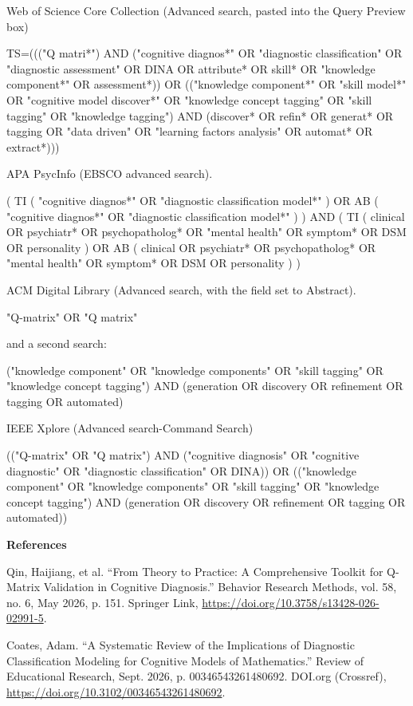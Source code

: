 \documentclass[sigconf]{acmart}
\begin{document}
Web of Science Core Collection (Advanced search, pasted into the Query Preview box)

TS=((("Q matri*") AND ("cognitive diagnos*" OR "diagnostic classification" OR "diagnostic assessment" OR DINA OR attribute* OR skill* OR "knowledge component*" OR assessment*)) OR (("knowledge component*" OR "skill model*" OR "cognitive model discover*" OR "knowledge concept tagging" OR "skill tagging" OR "knowledge tagging") AND (discover* OR refin* OR generat* OR tagging OR "data driven" OR "learning factors analysis" OR automat* OR extract*)))

APA PsycInfo (EBSCO advanced search). 

( TI ( "cognitive diagnos*" OR "diagnostic classification model*" ) OR AB ( "cognitive diagnos*" OR "diagnostic classification model*" ) ) AND ( TI ( clinical OR psychiatr* OR psychopatholog* OR "mental health" OR symptom* OR DSM OR personality ) OR AB ( clinical OR psychiatr* OR psychopatholog* OR "mental health" OR symptom* OR DSM OR personality ) )

ACM Digital Library (Advanced search, with the field set to Abstract). 

"Q-matrix" OR "Q matrix"

and a second search:

("knowledge component" OR "knowledge components" OR "skill tagging" OR "knowledge concept tagging") AND (generation OR discovery OR refinement OR tagging OR automated)

IEEE Xplore (Advanced search-Command Search)

(("Q-matrix" OR "Q matrix") AND ("cognitive diagnosis" OR "cognitive diagnostic" OR "diagnostic classification" OR DINA)) OR (("knowledge component" OR "knowledge components" OR "skill tagging" OR "knowledge concept tagging") AND (generation OR discovery OR refinement OR tagging OR automated))

\textbf{References}

Qin, Haijiang, et al. “From Theory to Practice: A Comprehensive Toolkit for Q-Matrix Validation in Cognitive Diagnosis.” Behavior Research Methods, vol. 58, no. 6, May 2026, p. 151. Springer Link, \href{https://doi.org/10.3758/s13428-026-02991-5}{https://doi.org/10.3758/s13428-026-02991-5}.

Coates, Adam. “A Systematic Review of the Implications of Diagnostic Classification Modeling for Cognitive Models of Mathematics.” Review of Educational Research, Sept. 2026, p. 00346543261480692. DOI.org (Crossref), \href{https://doi.org/10.3102/00346543261480692}{https://doi.org/10.3102/00346543261480692}.
\end{document}
